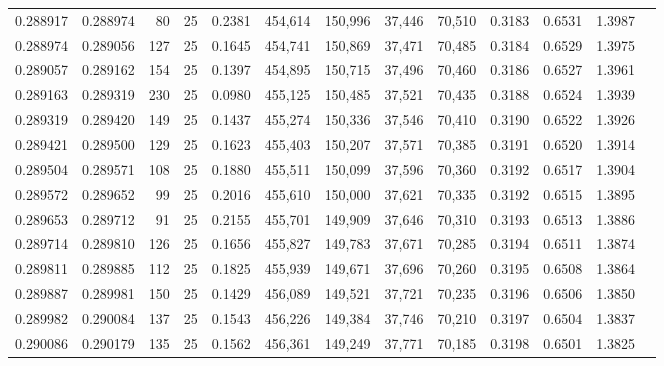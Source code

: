 \begin{tabular}{rrrrrrrrrrrrr}
0.288917 & 0.288974 &    80 &  25 &                                     0.2381 & 454,614 & 150,996 &  37,446 &  70,510 & 0.3183 & 0.6531 & 1.3987 \\
0.288974 & 0.289056 &   127 &  25 &                                     0.1645 & 454,741 & 150,869 &  37,471 &  70,485 & 0.3184 & 0.6529 & 1.3975 \\
0.289057 & 0.289162 &   154 &  25 &                                     0.1397 & 454,895 & 150,715 &  37,496 &  70,460 & 0.3186 & 0.6527 & 1.3961 \\
0.289163 & 0.289319 &   230 &  25 &                                     0.0980 & 455,125 & 150,485 &  37,521 &  70,435 & 0.3188 & 0.6524 & 1.3939 \\
0.289319 & 0.289420 &   149 &  25 &                                     0.1437 & 455,274 & 150,336 &  37,546 &  70,410 & 0.3190 & 0.6522 & 1.3926 \\
0.289421 & 0.289500 &   129 &  25 &                                     0.1623 & 455,403 & 150,207 &  37,571 &  70,385 & 0.3191 & 0.6520 & 1.3914 \\
0.289504 & 0.289571 &   108 &  25 &                                     0.1880 & 455,511 & 150,099 &  37,596 &  70,360 & 0.3192 & 0.6517 & 1.3904 \\
0.289572 & 0.289652 &    99 &  25 &                                     0.2016 & 455,610 & 150,000 &  37,621 &  70,335 & 0.3192 & 0.6515 & 1.3895 \\
0.289653 & 0.289712 &    91 &  25 &                                     0.2155 & 455,701 & 149,909 &  37,646 &  70,310 & 0.3193 & 0.6513 & 1.3886 \\
0.289714 & 0.289810 &   126 &  25 &                                     0.1656 & 455,827 & 149,783 &  37,671 &  70,285 & 0.3194 & 0.6511 & 1.3874 \\
0.289811 & 0.289885 &   112 &  25 &                                     0.1825 & 455,939 & 149,671 &  37,696 &  70,260 & 0.3195 & 0.6508 & 1.3864 \\
0.289887 & 0.289981 &   150 &  25 &                                     0.1429 & 456,089 & 149,521 &  37,721 &  70,235 & 0.3196 & 0.6506 & 1.3850 \\
0.289982 & 0.290084 &   137 &  25 &                                     0.1543 & 456,226 & 149,384 &  37,746 &  70,210 & 0.3197 & 0.6504 & 1.3837 \\
0.290086 & 0.290179 &   135 &  25 &                                     0.1562 & 456,361 & 149,249 &  37,771 &  70,185 & 0.3198 & 0.6501 & 1.3825 \\

\end{tabular}
